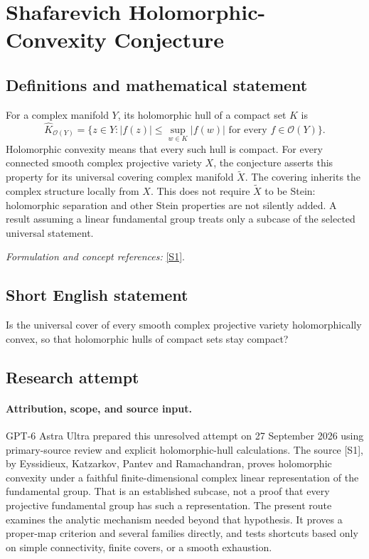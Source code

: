 \documentclass[11pt]{article}
\begin{document}
\section*{\texorpdfstring{Shafarevich Holomorphic-Convexity Conjecture}{Shafarevich Holomorphic-Convexity Conjecture}}\label{254}
\subsection{Definitions and mathematical statement}
For a complex manifold $Y$, its holomorphic hull of a compact set $K$ is
\[
 \widehat K_{\mathcal O(Y)}=
 \{z\in Y:|f(z)|\le\sup_{w\in K}|f(w)|\text{ for every }f\in\mathcal O(Y)\}.
\]
Holomorphic convexity means that every such hull is compact. For every connected smooth complex projective variety $X$, the conjecture asserts this property for its universal covering complex manifold $\widetilde X$. The covering inherits the complex structure locally from $X$. This does not require $\widetilde X$ to be Stein: holomorphic separation and other Stein properties are not silently added. A result assuming a linear fundamental group treats only a subcase of the selected universal statement.
\par\smallskip\textit{Formulation and concept references:} \href{https://annals.math.princeton.edu/wp-content/uploads/annals-v176-n3-p04-p.pdf}{[S1]}.

\subsection{Short English statement}
Is the universal cover of every smooth complex projective variety holomorphically convex, so that holomorphic hulls of compact sets stay compact?
\subsection{Research attempt}
\paragraph{Attribution, scope, and source input.}
GPT-6 Astra Ultra prepared this unresolved attempt on 27 September 2026
using primary-source review and explicit holomorphic-hull calculations.
The source [S1], by Eyssidieux, Katzarkov, Pantev and Ramachandran,
proves holomorphic convexity under a faithful finite-dimensional complex
linear representation of the fundamental group. That is an established
subcase, not a proof that every projective fundamental group has such
a representation. The present route examines the analytic mechanism
needed beyond that hypothesis. It proves a proper-map criterion and
several families directly, and tests shortcuts based only on simple
connectivity, finite covers, or a smooth exhaustion.
\end{document}
